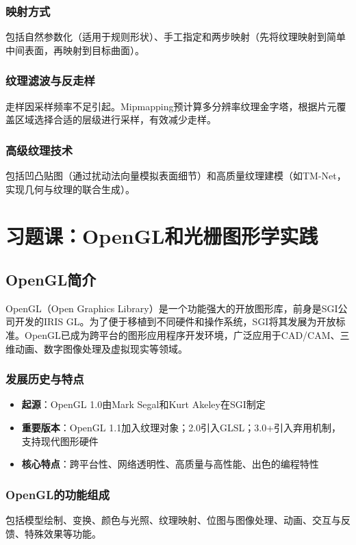 \documentclass[12pt]{article}
\begin{document}
\subsubsection{映射方式}
包括自然参数化（适用于规则形状）、手工指定和两步映射（先将纹理映射到简单中间表面，再映射到目标曲面）。

\subsubsection{纹理滤波与反走样}
走样因采样频率不足引起。Mipmapping预计算多分辨率纹理金字塔，根据片元覆盖区域选择合适的层级进行采样，有效减少走样。

\subsubsection{高级纹理技术}
包括凹凸贴图（通过扰动法向量模拟表面细节）和高质量纹理建模（如TM-Net，实现几何与纹理的联合生成）。

\newpage

\section{习题课：OpenGL和光栅图形学实践}

\subsection{OpenGL简介}

OpenGL（Open Graphics Library）是一个功能强大的开放图形库，前身是SGI公司开发的IRIS GL。为了便于移植到不同硬件和操作系统，SGI将其发展为开放标准。OpenGL已成为跨平台的图形应用程序开发环境，广泛应用于CAD/CAM、三维动画、数字图像处理及虚拟现实等领域。

\subsubsection{发展历史与特点}
\begin{itemize}
    \item \textbf{起源}：OpenGL 1.0由Mark Segal和Kurt Akeley在SGI制定
    \item \textbf{重要版本}：OpenGL 1.1加入纹理对象；2.0引入GLSL；3.0+引入弃用机制，支持现代图形硬件
    \item \textbf{核心特点}：跨平台性、网络透明性、高质量与高性能、出色的编程特性
\end{itemize}

\subsubsection{OpenGL的功能组成}
包括模型绘制、变换、颜色与光照、纹理映射、位图与图像处理、动画、交互与反馈、特殊效果等功能。
\end{document}
